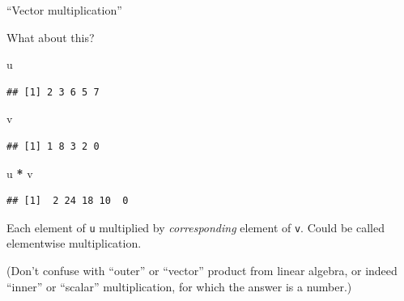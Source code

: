 \documentclass[
  ignorenonframetext,
]{beamer}
\newenvironment{Shaded}{\begin{snugshade}}{\end{snugshade}}
\newcommand{\NormalTok}[1]{#1}
\newcommand{\OperatorTok}[1]{\textcolor[rgb]{0.81,0.36,0.00}{\textbf{#1}}}
\newcommand{\StringTok}[1]{\textcolor[rgb]{0.31,0.60,0.02}{#1}}
\begin{document}
\begin{frame}[fragile]{``Vector multiplication''}
\protect\hypertarget{vector-multiplication}{}

What about this?

\begin{Shaded}
\begin{Highlighting}[]
\NormalTok{u}
\end{Highlighting}
\end{Shaded}

\begin{verbatim}
## [1] 2 3 6 5 7
\end{verbatim}

\begin{Shaded}
\begin{Highlighting}[]
\NormalTok{v}
\end{Highlighting}
\end{Shaded}

\begin{verbatim}
## [1] 1 8 3 2 0
\end{verbatim}

\begin{Shaded}
\begin{Highlighting}[]
\NormalTok{u }\OperatorTok{*}\StringTok{ }\NormalTok{v}
\end{Highlighting}
\end{Shaded}

\begin{verbatim}
## [1]  2 24 18 10  0
\end{verbatim}

Each element of \texttt{u} multiplied by \emph{corresponding} element of
\texttt{v}. Could be called elementwise multiplication.

(Don't confuse with ``outer'' or ``vector'' product from linear algebra,
or indeed ``inner'' or ``scalar'' multiplication, for which the answer
is a number.)

\end{frame}
\end{document}

